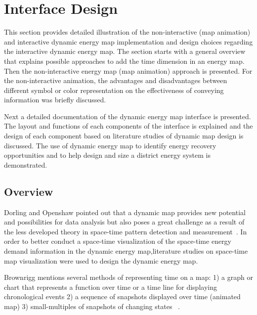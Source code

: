 \chapter{Interface Design} %

\label{Chapter6} %


This section provides detailed illustration of the non-interactive
(map animation) and interactive dynamic energy map implementation and
design choices regarding the interactive dynamic energy map. The
section starts with a general overview that explains possible
approaches to add the time dimension in an energy map. Then the
non-interactive energy map (map animation) approach is presented. For
the non-interactive animation, the advantages and disadvantages
between different symbol or color representation on the effectiveness
of conveying information was briefly discussed.

Next a detailed documentation of the dynamic energy map interface is
presented. The layout and functions of each components of the
interface is explained and the design of each component based on
literature studies of dynamic map design is discussed. The use of
dynamic energy map to identify energy recovery opportunities and to
help design and size a district energy system is demonstrated.

\section{Overview}

Dorling and Openshaw pointed out that a dynamic map provides new
potential and possibilities for data analysis but also poses a great
challenge as a result of the less developed theory in space-time
pattern detection and measurement~\cite{Dorling1992}. In order to
better conduct a space-time visualization of the space-time energy
demand information in the dynamic energy map,literature studies on
space-time map visualization were used to design the dynamic energy
map.

Brownrigg mentions several methods of representing time on a map: 1) a
graph or chart that represents a function over time or a time line for
displaying chronological events 2) a sequence of snapshots displayed
over time (animated map) 3) small-multiples of snapshots of changing
states ~\cite{Brownrigg2005}.

